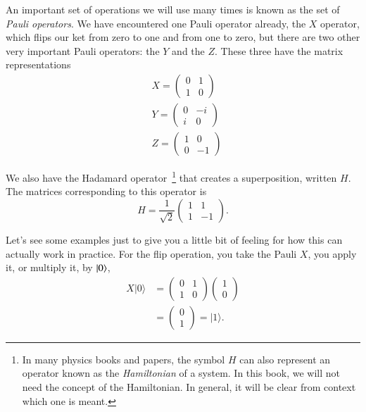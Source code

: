 An important set of operations we will use many times is known as the set of \emph{Pauli operators}. We have encountered one Pauli operator already, the $X$ operator, which flips our ket from zero to one and from one to zero, but there are two other very important Pauli operators: the $Y$ and the $Z$. These three have the matrix representations 
\begin{equation}
\begin{aligned}
&X=\left(\begin{array}{ll}
0 & 1 \\
1 & 0
\end{array}\right) \\
&Y=\left(\begin{array}{cc}
0 & -i \\
i & 0
\end{array}\right) \\
&Z=\left(\begin{array}{cc}
1 & 0 \\
0 & -1
\end{array}\right)
\end{aligned}
\end{equation}

We also have the Hadamard operator~\footnote{In many physics books and papers, the symbol $H$ can also represent an operator known as the \emph{Hamiltonian} of a system.  In this book, we will not need the concept of the Hamiltonian. In general, it will be clear from context which one is meant.} that creates a superposition, written $H$.  The matrices corresponding to this operator is
\begin{equation}
H=\frac{1}{\sqrt{2}}\left(\begin{array}{cc}
1 & 1 \\
1 & -1
\end{array}\right).
\end{equation}


Let's see some examples just to give you a little bit of feeling for how this can actually work in practice. For the flip operation, you take the Pauli $X$, you apply it, or multiply it, by $\left| 0 \right\rangle$,
\begin{equation}
\begin{aligned}
X|0\rangle &=\left(\begin{array}{ll}
0 & 1 \\
1 & 0
\end{array}\right)\left(\begin{array}{l}
1 \\
0
\end{array}\right) \\
&=\left(\begin{array}{l}
0 \\
1
\end{array}\right)=|1\rangle.
\end{aligned}
\end{equation}

